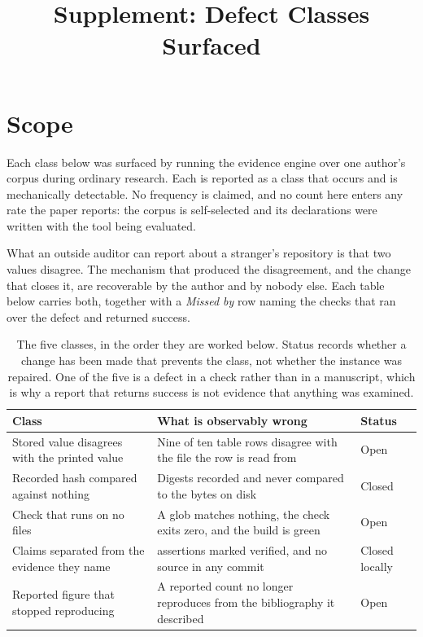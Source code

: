 \documentclass[11pt]{article}
\title{Supplement: Defect Classes Surfaced}
\author{}
\date{}
\begin{document}
\maketitle

\section*{Scope}

Each class below was surfaced by running the evidence engine over one author's corpus during
ordinary research. Each is reported as a class that occurs and is mechanically detectable.
No frequency is claimed, and no count here enters any rate the paper reports: the corpus is
self-selected and its declarations were written with the tool being evaluated.

What an outside auditor can report about a stranger's repository is that two values disagree.
The mechanism that produced the disagreement, and the change that closes it, are recoverable by
the author and by nobody else. Each table below carries both, together with a \emph{Missed by}
row naming the checks that ran over the defect and returned success.

\begin{table}[H]
\centering\small
\renewcommand{\arraystretch}{1.2}\setlength{\tabcolsep}{5pt}
\begin{tabular}{@{}>{\raggedright\arraybackslash}p{5.2cm}>{\raggedright\arraybackslash}p{7.8cm}>{\raggedright\arraybackslash}p{2.3cm}@{}}
\toprule
\textbf{Class} & \textbf{What is observably wrong} & \textbf{Status} \\
\midrule
Stored value disagrees with the printed value & Nine of ten table rows disagree with the file the row is read from & Open \\
Recorded hash compared against nothing & Digests recorded and never compared to the bytes on disk & Closed \\
Check that runs on no files & A glob matches nothing, the check exits zero, and the build is green & Open \\
Claims separated from the evidence they name & 178 assertions marked verified, and no source in any commit & Closed locally \\
Reported figure that stopped reproducing & A reported count no longer reproduces from the bibliography it described & Open \\
\bottomrule
\end{tabular}
\caption{The five classes, in the order they are worked below. Status records whether a change
has been made that prevents the class, not whether the instance was repaired. One of the five is a
defect in a check rather than in a manuscript, which is why a report that returns success is
not evidence that anything was examined.}
\label{tab:defect-summary}
\end{table}
\end{document}
